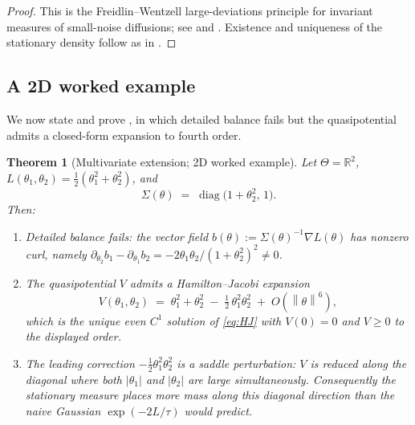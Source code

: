 \documentclass[11pt,a4paper]{article}
\newtheorem{theorem}{Theorem}[section]
\theoremstyle{definition}
\theoremstyle{remark}
\DeclareMathOperator{\diag}{diag}
\newcommand{\R}{\mathbb{R}}
\newcommand{\norm}[1]{\left\|#1\right\|}
\begin{document}
\begin{proof}
   This is the Freidlin--Wentzell large-deviations principle for invariant
   measures of small-noise diffusions; see
   \cite[Theorem~4.4.1]{FreidlinWentzell2012} and
   \cite[Theorem~5.7.12]{DemboZeitouni2010}.  Existence and uniqueness
   of the stationary density follow as in .
\end{proof}

\subsection{A 2D worked example}\label{sec:2d-example}

We now state and prove , in which detailed balance fails
but the quasipotential admits a closed-form expansion to fourth order.

\begin{theorem}[Multivariate extension; 2D worked example]\label{thm:multi}
   Let $\Theta = \R^2$, $L(\theta_1,\theta_2) = \tfrac{1}{2}(\theta_1^2
   + \theta_2^2)$, and
   \[
      \Sigma(\theta) \;=\; \diag\bigl(1 + \theta_2^2,\,1\bigr).
   \]
   Then:
   \begin{enumerate}[label=\textnormal{(\alph*)}]
   \item Detailed balance fails: the vector field
       $b(\theta) := \Sigma(\theta)^{-1}\nabla L(\theta)$ has nonzero
       curl, namely
       $\partial_{\theta_2} b_1 - \partial_{\theta_1} b_2
                 = -2\theta_1\theta_2/(1+\theta_2^2)^2 \neq 0$.
   \item The quasipotential $V$ admits a Hamilton--Jacobi expansion
       \begin{equation}\label{eq:V-expand}
          V(\theta_1,\theta_2)
          \;=\; \theta_1^2 + \theta_2^2
              \;-\; \tfrac{1}{2}\,\theta_1^2 \theta_2^2
              \;+\; O(\norm\theta^6),
       \end{equation}
       which is the unique even $C^1$ solution of \eqref{eq:HJ} with
       $V(0)=0$ and $V\geq 0$ to the displayed order.
   \item The leading correction $-\tfrac{1}{2}\theta_1^2\theta_2^2$ is
       a saddle perturbation: $V$ is reduced along the diagonal where
       both $|\theta_1|$ and $|\theta_2|$ are large simultaneously.
       Consequently the stationary measure places more mass along this
       diagonal direction than the naive Gaussian $\exp(-2L/\tau)$ would
       predict.
   \end{enumerate}
\end{theorem}
\end{document}
